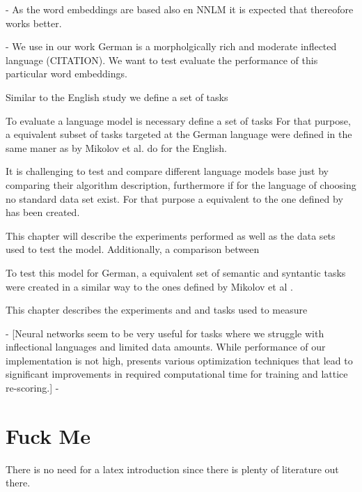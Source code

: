 - As the word embeddings are based also en \ac{NNLM} it is expected that
thereofore works better. 

- We use in our work German is a morpholgically rich and moderate inflected
language (CITATION). We want to test evaluate the performance of this
particular word embeddings. 

Similar to the English study we define a set of tasks 

To evaluate a language model is necessary define a set of tasks 
For that purpose, a equivalent subset of tasks targeted at the German language were
defined in the same maner as by Mikolov et al.
\cite{DBLP:journals/corr/abs-1301-3781} do for the English.  


It is challenging to test and compare different language models base just by
comparing their algorithm description, furthermore if for the language of
choosing no standard data set exist. For that purpose a equivalent  to the
one defined by  has been created. 

This chapter will describe the experiments performed as well as the data sets
used to test the model. Additionally, a comparison between

To test this model for  German,  a equivalent set of semantic and
syntantic tasks were created in a similar way to the ones defined by Mikolov
et al \cite{MikolovSCCD13}.

This chapter describes the experiments and and tasks used to measure  

- [Neural networks seem to be very useful for tasks where
we struggle with inflectional languages and limited data
amounts. While performance of our implementation is not
high,  presents various optimization techniques that lead to
significant improvements in required computational time for
training and lattice re-scoring.] - \cite{conf/icassp/MikolovKBGC09}




\section{Fuck Me}



There is no need for a latex introduction since there is plenty of literature out there.



